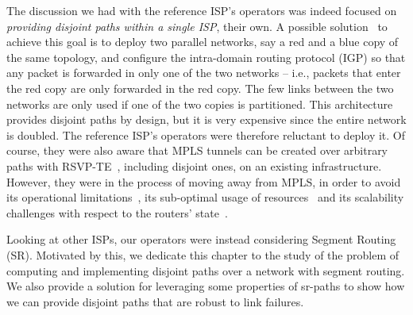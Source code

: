 The discussion we had with the reference ISP's operators was indeed focused on
\textit{providing disjoint paths within a single ISP}, their own. A possible
solution~\cite{art:2014} to achieve this goal is to deploy two parallel
networks, say a red and a blue copy of the same topology, and configure the
intra-domain routing protocol (IGP) so that any packet is forwarded in only one of
the two networks -- i.e., packets that enter the red copy are only forwarded in
the red copy.
The few links between the two networks are only used if one of the two copies is
partitioned. This architecture provides disjoint paths by design, but it is very
expensive since the entire network is doubled.
The reference ISP's operators were therefore reluctant to deploy it.
Of course, they were also aware that MPLS tunnels can be created over
arbitrary paths with RSVP-TE~\cite{rfc3209}, including disjoint ones, on an
existing infrastructure.
However, they were in the process of moving away from MPLS, in order to avoid
its operational limitations~\cite{mpls-opissues-ripe64}, its sub-optimal usage
of resources~\cite{mpls-latency-imc11} and its scalability challenges with
respect to the routers' state~\cite{rfc5439,defo-sig15}.


Looking at other ISPs, our operators were instead considering Segment Routing
(SR). Motivated by this, we dedicate this chapter to the study of the problem of computing and implementing disjoint paths over a network
with segment routing. We also provide a solution for leveraging some properties of sr-paths to
show how we can provide disjoint paths that are robust to link failures.








